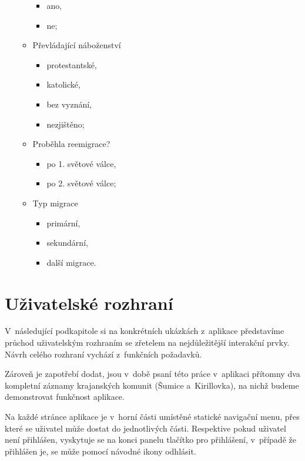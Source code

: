 \begin{itemize}
\begin{itemize}
    \begin{itemize}
    \tightlist
    \item
      ano,
    \item
      ne;
    \end{itemize}
  \item
    Převládající náboženství

    \begin{itemize}
    \tightlist
    \item
      protestantské,
    \item
      katolické,
    \item
      bez vyznání,
    \item
      nezjištěno;
    \end{itemize}
  \item
    Proběhla reemigrace?

    \begin{itemize}
    \tightlist
    \item
      po 1. světové válce,
    \item
      po 2. světové válce;
    \end{itemize}
  \item
    Typ migrace

    \begin{itemize}
    \tightlist
    \item
      primární,
    \item
      sekundární,
    \item
      další migrace.
    \end{itemize}
  \end{itemize}
\end{itemize}

\hypertarget{uux17eivatelskuxe9-rozhranuxed}{%
\section{Uživatelské rozhraní}\label{uux17eivatelskuxe9-rozhranuxed}}

V~následující podkapitole si na konkrétních ukázkách z~aplikace představíme průchod uživatelským rozhraním se zřetelem na nejdůležitější interakční prvky. Návrh celého rozhraní vychází z~funkčních požadavků.

Zároveň je zapotřebí dodat, jsou v~době psaní této práce v~aplikaci přítomny dva kompletní záznamy krajanských komunit (Šumice a~Kirillovka), na nichž budeme demonstrovat funkčnost aplikace.

Na každé stránce aplikace je v~horní části umístěné statické navigační menu, přes které se uživatel může dostat do jednotlivých části. Respektive pokud uživatel není přihlášen, vyskytuje se na konci panelu tlačítko pro přihlášení, v~případě že přihlášen je, se může pomocí návodné ikony odhlásit.

